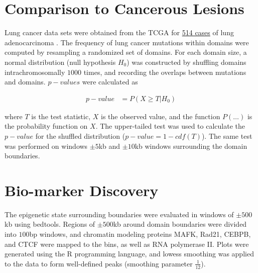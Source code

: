 \section*{Comparison to Cancerous Lesions}\label{sec:resampling}

Lung cancer data sets were obtained from the \gls{TCGA} for
\href{https://tcga-data.nci.nih.gov/tcga/tcgaCancerDetails.jsp?diseaseType=LUAD&diseaseName=Lung\%20adenocarcinoma}{514 cases}
of lung adenocarcinoma \citep{cerami2012,gao2013}.  The frequency of lung cancer mutations within domains were computed by resampling
a randomized set of domains.  For each domain size, a normal distribution (null hypothesis $H_0$) was constructed by shuffling domains
intrachromosomally $1000$ times, and recording the overlaps between mutations and domains.  $p-values$ were calculated as

\begin{align}
  p-value &= P(X \geq T | H_0)
\end{align}

where $T$ is the test statistic, $X$ is the observed value, and the function $P(\dots)$ is the probability function on $X$.  The upper-tailed
test was used to calculate the $p-value$ for the shuffled distribution ($p-value = 1 - cdf(T)$).  The same test was performed on windows
$\pm5$kb and $\pm10$kb windows surrounding the domain boundaries.

\section*{Bio-marker Discovery}

The epigenetic state surrounding boundaries were evaluated in windows of $\pm500$kb using bedtools.  Regions of $\pm500$kb around
domain boundaries were divided into $100$bp windows, and chromatin modeling proteins MAFK, Rad21, CEBPB, and CTCF were mapped to
the bins, as well as RNA polymerase II\@.  Plots were generated using the R programming language, and lowess smoothing was applied
to the data to form well-defined peaks (smoothing parameter $\frac{1}{12}$).
